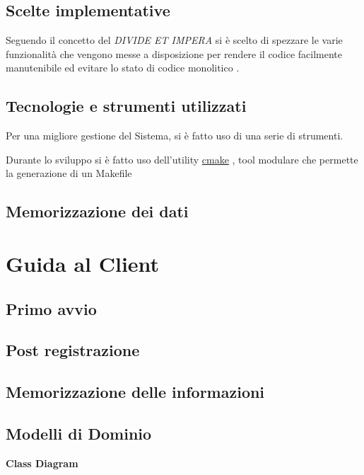 \documentclass[letterpaper, 11pt]{article}
\begin{document}
\subsection{Scelte implementative}
\label{Guida al Server - Scelte implementative}
Seguendo il concetto del \emph{DIVIDE ET IMPERA} \autocite{DIVIDE_ET_IMPERA} si è scelto di spezzare le varie funzionalità che vengono messe a disposizione per rendere il codice facilmente manutenibile ed evitare lo stato di codice monolitico \autocite{MONOLITICO}.
\subsection{Tecnologie e strumenti utilizzati}
\label{Guida al Server -}
Per una migliore gestione del Sistema, si è fatto uso di una serie di strumenti.

Durante lo sviluppo si è fatto uso dell'utility \href{https://cmake.org/}{cmake} \autocite{CMAKE}, tool modulare che permette la generazione di un Makefile \autocite{MAKEFILE}
\subsection{Memorizzazione dei dati}
\label{Guida al Server - Memorizzazione dei dati}
\section{Guida al Client}
\label{Guida al Client}
\subsection{Primo avvio}
\label{Guida al Client - Primo avvio}
\subsection{Post registrazione}
\label{Guida al Client - Post registrazione}
\subsection{Memorizzazione delle informazioni}
\label{Guida al Client - Memorizzazione delle informazioni}
\subsection{Modelli di Dominio}
\label{sec:orga47dad6}
\begin{center}
\textbf{Class Diagram}
\end{center}
\end{document}
